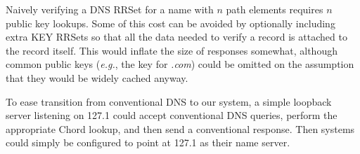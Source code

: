 Naively verifying a DNS RRSet for a name with $n$ 
path elements requires $n$ public key lookups.
Some of this cost can be avoided by optionally
including extra KEY RRSets so that all 
the data needed to verify a record
is attached to the record itself.
This would inflate the size of responses somewhat, although
common public keys ({\em e.g.}, the key for {\em .com}) could
be omitted on the assumption that they would be 
widely cached anyway.

To ease transition from conventional DNS to our system,
a simple loopback server listening on 127.1 could accept
conventional DNS queries, perform the appropriate Chord lookup,
and then send a conventional response.
Then systems could simply be configured to 
point at 127.1 as their name server.

